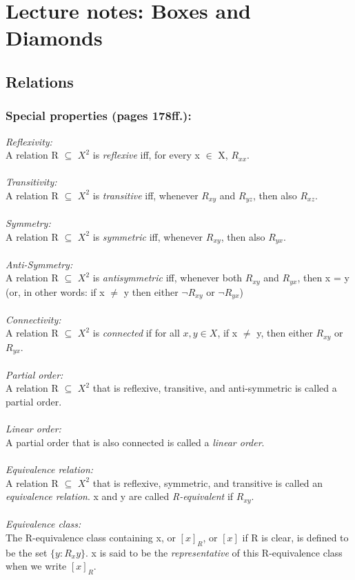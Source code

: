 \documentclass{report}
\begin{document}
 	\section{Lecture notes: Boxes and Diamonds}
 	
 	\subsection{Relations}
 	\subsubsection{Special properties (pages 178ff.):}
 	\textit{Reflexivity:} \\
 	A relation R $\subseteq$ $X^2$ is \textit{reflexive} iff, for every x $\in$ X, $R_{xx}$. \\
 	\\
 	\textit{Transitivity:} \\
 	A relation R $\subseteq$ $X^2$ is \textit{transitive} iff, whenever $R_{xy}$ and $R_{yz}$, then also $R_{xz}$. \\
 	\\
 	\textit{Symmetry:} \\
 	A relation R $\subseteq$ $X^2$ is \textit{symmetric} iff, whenever $R_{xy}$, then also $R_{yx}$. \\
 	\\
 	\textit{Anti-Symmetry:} \\
 	A relation R $\subseteq$ $X^2$ is \textit{antisymmetric} iff, whenever both $R_{xy}$ and $R_{yx}$, then x = y (or, in other words: if x $\neq$ y then either $\neg R_{xy}$ or $\neg R_{yx}$) \\
 	\\
 	\textit{Connectivity:} \\
 	A relation R $\subseteq$ $X^2$ is \textit{connected} if for all $x,y \in X$, if x $\neq$ y, then either  $R_{xy}$ or $R_{yx}$. \\
 	\\
 	\textit{Partial order:} \\
 	A relation R $\subseteq$ $X^2$ that is reflexive, transitive, and anti-symmetric is called a partial order. \\
 	\\
 	\textit{Linear order:} \\
 	A partial order that is also connected is called a \textit{linear order}. \\
 	\\
 	\textit{Equivalence relation:} \\
 	A relation R $\subseteq$ $X^2$ that is reflexive, symmetric, and transitive is called an \textit{equivalence relation}. x and y are called \textit{R-equivalent} if $R_{xy}$. \\
 	\\
 	\textit{Equivalence class:} \\
 	The R-equivalence class containing x, or $\left[ x \right]_R$, or $\left[ x \right]$ if R is clear, is defined to be the set $\lbrace y: R_xy \rbrace$. x is said to be the \textit{representative} of this R-equivalence class when we write $\left[ x \right]_R$.
 	
\end{document}
